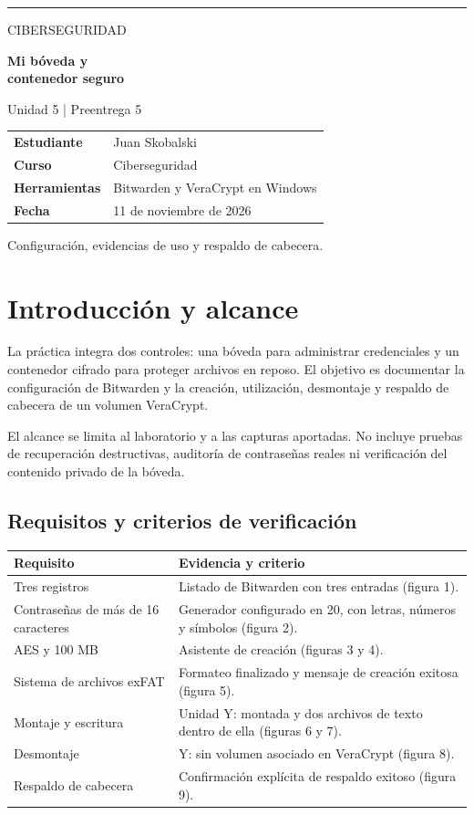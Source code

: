 \documentclass[11pt,a4paper]{article}
\begin{document}
\thispagestyle{empty}
\par
\rule{\textwidth}{0.5pt}\vspace{2cm}
{\Large\color{gris}CIBERSEGURIDAD}\par
{\Huge\bfseries\color{azul}Mi bóveda y\\contenedor seguro}\par
{}\par
\vspace{1cm}Unidad 5 | Preentrega 5
\vfill
\colorbox{fondo}{\parbox{\dimexpr\textwidth-2\fboxsep}{
\begin{tabularx}{\linewidth}{lX}
\textbf{Estudiante} & Juan Skobalski\\
\textbf{Curso} & Ciberseguridad\\
\textbf{Herramientas} & Bitwarden y VeraCrypt en Windows\\
\textbf{Fecha} & 11 de noviembre de 2026
\end{tabularx}}}
\vspace{1cm}
Configuración, evidencias de uso y respaldo de cabecera.
\clearpage
\section{Introducción y alcance}
La práctica integra dos controles: una bóveda para administrar credenciales y un contenedor cifrado para proteger archivos en reposo. El objetivo es documentar la configuración de Bitwarden y la creación, utilización, desmontaje y respaldo de cabecera de un volumen VeraCrypt.

El alcance se limita al laboratorio y a las capturas aportadas. No incluye pruebas de recuperación destructivas, auditoría de contraseñas reales ni verificación del contenido privado de la bóveda.
\subsection{Requisitos y criterios de verificación}
\begin{tabularx}{\textwidth}{p{4.6cm}X}
\toprule
\textbf{Requisito} & \textbf{Evidencia y criterio}\\\midrule
Tres registros & Listado de Bitwarden con tres entradas (figura 1).\\
Contraseñas de más de 16 caracteres & Generador configurado en 20, con letras, números y símbolos (figura 2).\\
AES y 100 MB & Asistente de creación (figuras 3 y 4).\\
Sistema de archivos exFAT & Formateo finalizado y mensaje de creación exitosa (figura 5).\\
Montaje y escritura & Unidad Y: montada y dos archivos de texto dentro de ella (figuras 6 y 7).\\
Desmontaje & Y: sin volumen asociado en VeraCrypt (figura 8).\\
Respaldo de cabecera & Confirmación explícita de respaldo exitoso (figura 9).\\\bottomrule
\end{tabularx}
\end{document}
